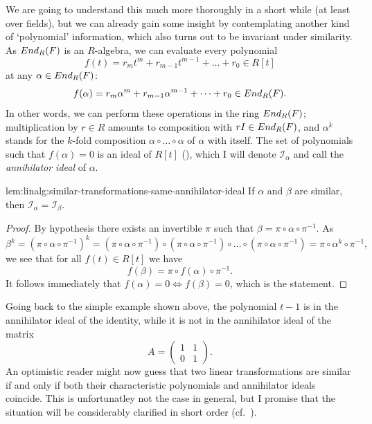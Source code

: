 We are going to understand this much more thoroughly in a short while
(at least over fields), but we can already gain some insight by
contemplating another kind of `polynomial' information, which also
turns out to be invariant under similarity. As $End_R(F)$ is an
$R$-algebra, we can evaluate every polynomial
\[
  f(t) = r_m t^m + r_{m-1} t^{m-1} + \dots + r_0 \in R[t]
\]
at any $\alpha \in End_R(F)$:
\[
  f(\alpha) = r_m \alpha^m + r_{m-1} \alpha^{m-1} + \dots + r_0 \in
  End_R(F).
\]
In other words, we can perform these operations in the ring
$End_R(F)$; multiplication by $r \in R$ amounts to composition with
$rI \in End_R(F)$, and $\alpha^k$ stands for the $k$-fold composition
$\alpha \circ \dots \circ \alpha$ of $\alpha$ with itself. The set of
polynomials such that $f(\alpha) = 0$ is an ideal of $R[t]$
(), which
I will denote $\mathscr{I}_\alpha$ and call the \emph{annihilator
  ideal} of $\alpha$.
\begin{lem}{}{lem:linalg:similar-transformations-same-annihilator-ideal}
  If $\alpha$ and $\beta$ are similar, then
  $\mathscr{I}_\alpha = \mathscr{I}_\beta$.
\end{lem}
\begin{proof}
  By hypothesis there exists an invertible $\pi$ such that
  $\beta = \pi \circ \alpha \circ \pi^{-1}$. As
  \[
    \beta^k = (\pi \circ \alpha \circ \pi^{-1})^k = (\pi \circ \alpha
    \circ \pi^{-1}) \circ (\pi \circ \alpha \circ \pi^{-1}) \circ
    \dots \circ (\pi \circ \alpha \circ \pi^{-1}) = \pi \circ \alpha^k
    \circ \pi^{-1},
  \]
  we see that for all $f(t) \in R[t]$ we have
  \[
    f(\beta) = \pi \circ f(\alpha) \circ \pi^{-1}.
  \]
  It follows immediately that $f(\alpha) = 0 \iff f(\beta) = 0$, which
  is the statement.
\end{proof}

Going back to the simple example shown above, the polynomial $t - 1$
is in the annihilator ideal of the identity, while it is not in the
annihilator ideal of the matrix
\[
  A = \begin{pmatrix} 1 & 1 \\ 0 & 1 \end{pmatrix}.
\]
An optimistic reader might now guess that two linear transformations
are similar if and only if both their characteristic polynomials and
annihilator ideals coincide. This is unfortunatley not the case in
general, but I promise that the situation will be considerably
clarified in short order (cf.\
).

